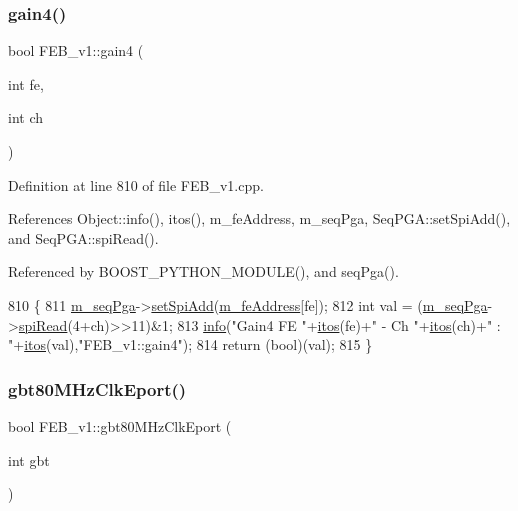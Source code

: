 \subsubsection{\texorpdfstring{gain4()}{gain4()}}
{\footnotesize\ttfamily bool F\+E\+B\+\_\+v1\+::gain4 (\begin{DoxyParamCaption}\item[{int}]{fe,  }\item[{int}]{ch }\end{DoxyParamCaption})}



Definition at line 810 of file F\+E\+B\+\_\+v1.\+cpp.



References Object\+::info(), itos(), m\+\_\+fe\+Address, m\+\_\+seq\+Pga, Seq\+P\+G\+A\+::set\+Spi\+Add(), and Seq\+P\+G\+A\+::spi\+Read().



Referenced by B\+O\+O\+S\+T\+\_\+\+P\+Y\+T\+H\+O\+N\+\_\+\+M\+O\+D\+U\+L\+E(), and seq\+Pga().


\begin{DoxyCode}
810                                    \{
811   \hyperlink{classFEB__v1_a6c7804ac86796f233a8393043adf2e77}{m\_seqPga}->\hyperlink{classSeqPGA_ac998ce3a6d9b5f2e88cc8393f8c1df53}{setSpiAdd}(\hyperlink{classFEB__v1_a4e1945c2d5b434125f375e9d0fc6d99f}{m\_feAddress}[fe]);
812   \textcolor{keywordtype}{int} val = (\hyperlink{classFEB__v1_a6c7804ac86796f233a8393043adf2e77}{m\_seqPga}->\hyperlink{classSeqPGA_ab3d0e5e5d4014bc7a92588a76b8713d4}{spiRead}(4+ch)>>11)&1;
813   \hyperlink{classObject_a644fd329ea4cb85f54fa6846484b84a8}{info}(\textcolor{stringliteral}{"Gain4 FE "}+\hyperlink{Tools_8h_af330027dbdafb9a30768b3613c553e60}{itos}(fe)+\textcolor{stringliteral}{" - Ch "}+\hyperlink{Tools_8h_af330027dbdafb9a30768b3613c553e60}{itos}(ch)+\textcolor{stringliteral}{" : "}+\hyperlink{Tools_8h_af330027dbdafb9a30768b3613c553e60}{itos}(val),\textcolor{stringliteral}{"FEB\_v1::gain4"});
814   \textcolor{keywordflow}{return} (\textcolor{keywordtype}{bool})(val);
815 \}
\end{DoxyCode}
\mbox{\label{classFEB__v1_ac22b1ffdc20be66330a66ebd12cd13f1}} 
\subsubsection{\texorpdfstring{gbt80\+M\+Hz\+Clk\+Eport()}{gbt80MHzClkEport()}}
{\footnotesize\ttfamily bool F\+E\+B\+\_\+v1\+::gbt80\+M\+Hz\+Clk\+Eport (\begin{DoxyParamCaption}\item[{int}]{gbt }\end{DoxyParamCaption})}



